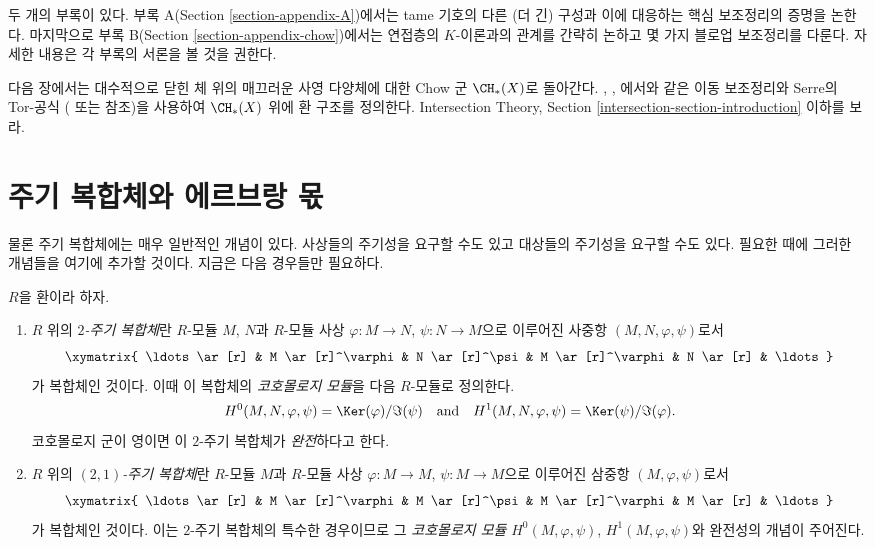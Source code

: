 \medskip\noindent
두 개의 부록이 있다. 부록 A(Section \ref{section-appendix-A})에서는
tame 기호의 다른 (더 긴) 구성과 이에 대응하는 핵심 보조정리의 증명을
논한다. 마지막으로 부록 B(Section \ref{section-appendix-chow})에서는
연접층의 $K$-이론과의 관계를 간략히 논하고 몇 가지 블로업 보조정리를
다룬다. 자세한 내용은 각 부록의 서론을 볼 것을 권한다.

\medskip\noindent
다음 장에서는 대수적으로 닫힌 체 위의 매끄러운 사영 다양체에 대한
Chow 군 $\CH_*(X)$로 돌아간다. \cite{Samuel}, \cite{ChevalleyI},
\cite{ChevalleyII}에서와 같은 이동 보조정리와 Serre의 Tor-공식
(\cite{Serre_local_algebra} 또는 \cite{Serre_algebre_locale} 참조)을
사용하여 $\CH_*(X)$ 위에 환 구조를 정의한다. Intersection Theory,
Section \ref{intersection-section-introduction} 이하를 보라.








\section{주기 복합체와 에르브랑 몫}
\label{section-periodic-complexes}

\noindent
물론 주기 복합체에는 매우 일반적인 개념이 있다. 사상들의 주기성을
요구할 수도 있고 대상들의 주기성을 요구할 수도 있다. 필요한 때에
그러한 개념들을 여기에 추가할 것이다. 지금은 다음 경우들만 필요하다.

\begin{definition}
\label{definition-periodic-complex}
$R$을 환이라 하자.
\begin{enumerate}
\item $R$ 위의 {\it $2$-주기 복합체}란 $R$-모듈 $M$, $N$과
$R$-모듈 사상 $\varphi : M \to N$, $\psi : N \to M$으로 이루어진
사중항 $(M, N, \varphi, \psi)$로서
$$
\xymatrix{
\ldots \ar[r] &
M \ar[r]^\varphi &
N \ar[r]^\psi &
M \ar[r]^\varphi &
N \ar[r] & \ldots
}
$$
가 복합체인 것이다. 이때 이 복합체의 {\it 코호몰로지 모듈}을
다음 $R$-모듈로 정의한다.
$$
H^0(M, N, \varphi, \psi) = \Ker(\varphi)/\Im(\psi)
\quad\text{and}\quad
H^1(M, N, \varphi, \psi) = \Ker(\psi)/\Im(\varphi).
$$
코호몰로지 군이 영이면 이 $2$-주기 복합체가 {\it 완전}하다고 한다.
\item $R$ 위의 {\it $(2, 1)$-주기 복합체}란 $R$-모듈 $M$과
$R$-모듈 사상 $\varphi : M \to M$, $\psi : M \to M$으로 이루어진
삼중항 $(M, \varphi, \psi)$로서
$$
\xymatrix{
\ldots \ar[r] &
M \ar[r]^\varphi &
M \ar[r]^\psi &
M \ar[r]^\varphi &
M \ar[r] & \ldots
}
$$
가 복합체인 것이다. 이는 $2$-주기 복합체의 특수한 경우이므로
그 {\it 코호몰로지 모듈} $H^0(M, \varphi, \psi)$,
$H^1(M, \varphi, \psi)$와 완전성의 개념이 주어진다.
\end{enumerate}
\end{definition}

